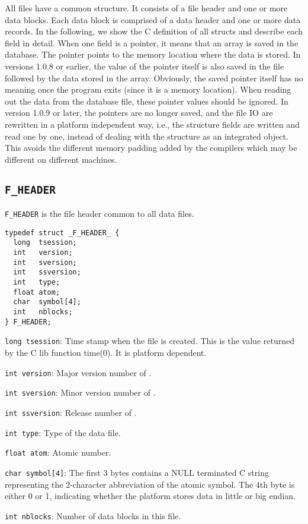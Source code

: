 All files have a common structure. It consists of a file header and one or
more data blocks. Each data block is comprised of a data header and one or
more data records. In the following, we show the C definition of all structs
and describe each field in detail. When one field is a pointer, it means that
an array is saved in the database. The pointer points to the memory location
where the data is stored. In versions 1.0.8 or earlier, the value of the
pointer itself is also saved in the file followed by the data stored in the
array. Obviously, the saved pointer itself has no meaning once the program
exits (since it is a memory location). When reading out the data from the
database file, these pointer values should be ignored. In version 1.0.9 or
later, the pointers are no longer saved, and the file IO are rewritten in a
platform independent way, i.e., the structure fields are written and read one
by one, instead of dealing with the structure as an integrated object. This
avoids the different memory padding added by the compilers which may be
different on different machines.

\subsection{\texttt{F\_HEADER}}
\texttt{F\_HEADER} is the file header common to all data files. 

\begin{verbatim}
typedef struct _F_HEADER_ {
  long  tsession;
  int   version;
  int   sversion;
  int   ssversion;
  int   type;
  float atom;
  char  symbol[4];
  int   nblocks;
} F_HEADER;
\end{verbatim}

\begin{dbdesc}
\item[\texttt{long tsession}:] Time stamp when the file is created. This is the
value returned by the C lib function time(0). It is platform dependent. 
\item[\texttt{int version}:] Major version number of \cFAC.
\item[\texttt{int sversion}:] Minor version number of \cFAC.
\item[\texttt{int ssversion}:] Release number of \cFAC.
\item[\texttt{int type}:] Type of the data file.
\item[\texttt{float atom}:] Atomic number.
\item[\texttt{char symbol[4]}:] The first 3 bytes contains a NULL
terminated C string representing the 2-character abbreviation of the atomic
symbol. The 4th byte is either 0 or 1, indicating whether the platform stores
data in little or big endian.
\item[\texttt{int nblocks}:] Number of data blocks in this file.
\end{dbdesc}

